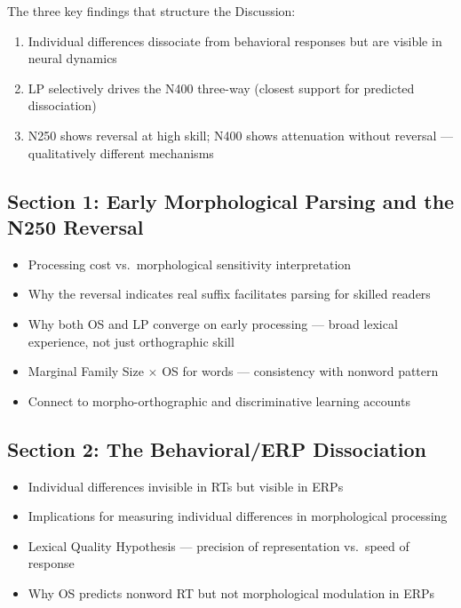 \documentclass[11pt, a4paper]{article}
\begin{document}
The three key findings that structure the Discussion:
\begin{enumerate}[leftmargin=1.5em]
  \item Individual differences dissociate from behavioral responses but are visible in neural dynamics
  \item LP selectively drives the N400 three-way (closest support for predicted dissociation)
  \item N250 shows reversal at high skill; N400 shows attenuation without reversal — qualitatively different mechanisms
\end{enumerate}

\subsection{Section 1: Early Morphological Parsing and the N250 Reversal}
\begin{itemize}[leftmargin=1.5em]
  \item Processing cost vs.\ morphological sensitivity interpretation
  \item Why the reversal indicates real suffix facilitates parsing for skilled readers
  \item Why both OS and LP converge on early processing — broad lexical experience, not just orthographic skill
  \item Marginal Family Size $\times$ OS for words — consistency with nonword pattern
  \item Connect to morpho-orthographic and discriminative learning accounts
\end{itemize}

\subsection{Section 2: The Behavioral/ERP Dissociation}
\begin{itemize}[leftmargin=1.5em]
  \item Individual differences invisible in RTs but visible in ERPs
  \item Implications for measuring individual differences in morphological processing
  \item Lexical Quality Hypothesis — precision of representation vs.\ speed of response
  \item Why OS predicts nonword RT but not morphological modulation in ERPs
\end{itemize}
\end{document}
